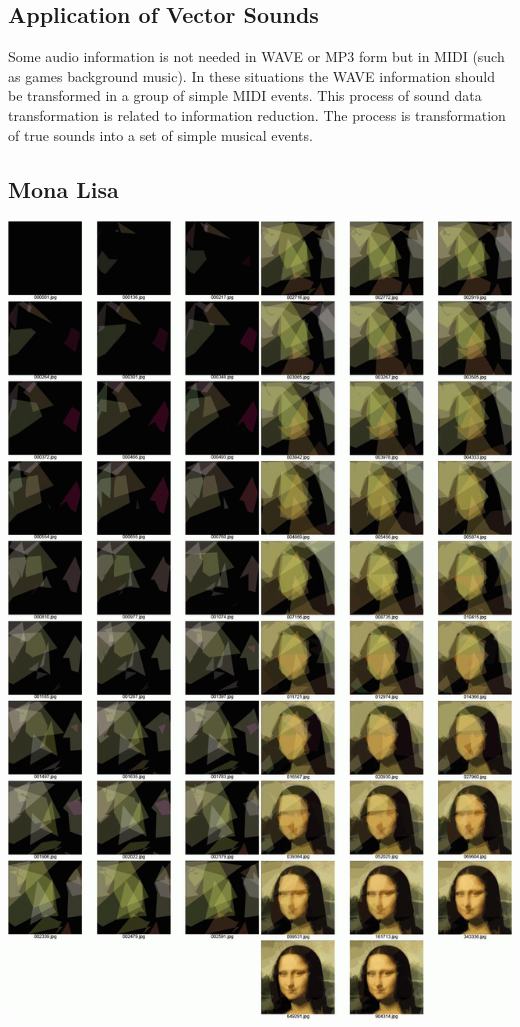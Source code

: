 \documentclass[a0,portrait,25pt]{sciposter}
\begin{document}
\begin{multicols}{3}
\begin{mdframed}[backgroundcolor=white,roundcorner=4pt,shadow=true,linewidth=1pt]
\color{Black}
\section*{Application of Vector Sounds}
Some audio information is not needed in WAVE or MP3 form but in MIDI (such as games background music). In these situations the WAVE information should be transformed in a group of simple MIDI events. This process of sound data transformation is related to information reduction. The process is transformation of true sounds into a set of simple musical events. 
\end{mdframed}
 
\begin{mdframed}[backgroundcolor=white,roundcorner=4pt,shadow=true,linewidth=1pt]
\section*{Mona Lisa}
\begin{minipage}[c]{1\linewidth}
\includegraphics[width=1.0\linewidth]{pic001}
\end{minipage}
\end{mdframed} 


\end{multicols}
\end{document}
